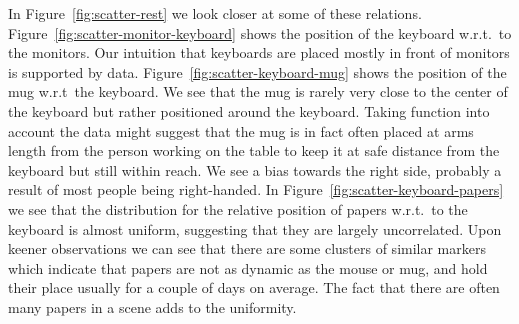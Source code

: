 \documentclass[letterpaper, 10 pt, conference]{ieeeconf}
\begin{document}
In Figure~\ref{fig:scatter-rest} we look closer at some of these relations. 
Figure~\ref{fig:scatter-monitor-keyboard} shows the position of 
the keyboard w.r.t.\ to the monitors. Our intuition that keyboards are 
placed mostly in front of monitors is supported by data. 
Figure~\ref{fig:scatter-keyboard-mug} shows the position of the mug w.r.t\ 
the keyboard. We see that the mug is rarely very close to the center of the 
keyboard but rather positioned around the keyboard. Taking function into 
account the data might suggest that the mug 
is in fact often placed at arms length from the person working on the table 
to keep it at safe distance from the keyboard but still within 
reach. We see a bias towards the right side, probably a result of most 
people being right-handed. In Figure~\ref{fig:scatter-keyboard-papers} we see 
that the distribution for the relative position of papers w.r.t.\ to the 
keyboard is almost uniform, suggesting that they are largely uncorrelated. 
Upon keener observations we can see that there are some clusters of similar 
markers which indicate that papers are not as dynamic as the mouse or mug, 
and hold their place usually for a couple of days on average. 
The fact that there are often many papers in a scene adds to the uniformity.
\end{document}
